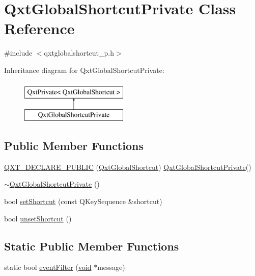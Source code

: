 \hypertarget{class_qxt_global_shortcut_private}{\section{Qxt\-Global\-Shortcut\-Private Class Reference}
\label{class_qxt_global_shortcut_private}
}


{\ttfamily \#include $<$qxtglobalshortcut\-\_\-p.\-h$>$}

Inheritance diagram for Qxt\-Global\-Shortcut\-Private\-:\begin{figure}[H]
\begin{center}
\leavevmode
\includegraphics[height=2.000000cm]{class_qxt_global_shortcut_private}
\end{center}
\end{figure}
\subsection*{Public Member Functions}
\begin{DoxyCompactItemize}
\item 
\hyperlink{class_qxt_global_shortcut_private_a20dba3b7d28f7deb03e76933391fd9f2}{Q\-X\-T\-\_\-\-D\-E\-C\-L\-A\-R\-E\-\_\-\-P\-U\-B\-L\-I\-C} (\hyperlink{class_qxt_global_shortcut}{Qxt\-Global\-Shortcut}) \hyperlink{class_qxt_global_shortcut_private}{Qxt\-Global\-Shortcut\-Private}()
\item 
\hyperlink{class_qxt_global_shortcut_private_a775a52ac5138216db832918f0f4c1751}{$\sim$\-Qxt\-Global\-Shortcut\-Private} ()
\item 
bool \hyperlink{class_qxt_global_shortcut_private_a896525de4bbde4deee06c0aeed201579}{set\-Shortcut} (const Q\-Key\-Sequence \&shortcut)
\item 
bool \hyperlink{class_qxt_global_shortcut_private_a0df0652403762e50f6c9a6d2fadf8c8e}{unset\-Shortcut} ()
\end{DoxyCompactItemize}
\subsection*{Static Public Member Functions}
\begin{DoxyCompactItemize}
\item 
static bool \hyperlink{class_qxt_global_shortcut_private_a99d2771c3db0285a2fc202c409848d68}{event\-Filter} (\hyperlink{group___u_a_v_objects_plugin_ga444cf2ff3f0ecbe028adce838d373f5c}{void} $\ast$message)
\end{DoxyCompactItemize}
